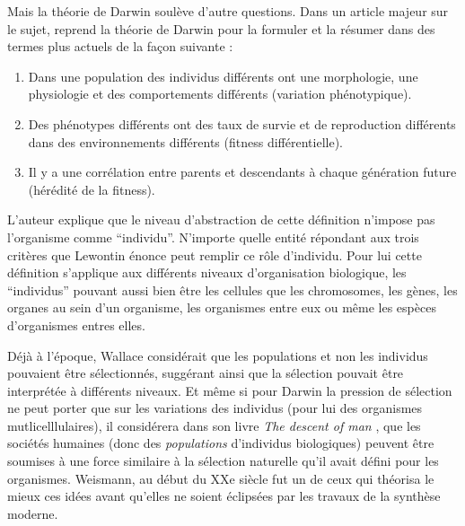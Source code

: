 Mais la théorie de Darwin soulève d'autre questions. Dans un article majeur sur le sujet, \cite{lewontin70unitsselection} reprend la théorie de Darwin pour la formuler et la résumer dans des termes plus actuels de la façon suivante :
\begin{enumerate}
	\item Dans une population des individus différents ont une morphologie, une physiologie et des comportements différents (variation phénotypique).
	\item Des phénotypes différents ont des taux de survie et de reproduction différents dans des environnements différents (fitness différentielle).
	\item Il y a une corrélation entre parents et descendants à chaque génération future (hérédité de la fitness).
\end{enumerate}

L'auteur explique que le niveau d'abstraction de cette définition n'impose pas l'organisme comme ``individu''. N'importe quelle entité répondant aux trois critères que Lewontin énonce peut remplir ce rôle d'individu. Pour lui cette définition s'applique aux différents niveaux d'organisation biologique, les ``individus'' pouvant aussi bien être les cellules que les chromosomes, les gènes, les organes au sein d'un organisme, les organismes entre eux ou même les espèces d'organismes entres elles. 

Déjà à l'époque, Wallace considérait que les populations et non les individus pouvaient être sélectionnés, suggérant ainsi que la sélection pouvait être interprétée à différents niveaux. Et même si pour Darwin la pression de sélection ne peut porter que sur les variations des individus (pour lui des organismes mutlicelllulaires), il considérera dans son livre \emph{The descent of man} \citep{darwin1871thedescentofman}, que les sociétés humaines (donc des \emph{populations} d'individus biologiques) peuvent être soumises à une force similaire à la sélection naturelle qu'il avait défini pour les organismes. Weismann, au début du XXe siècle fut un de ceux qui théorisa le mieux ces idées avant qu'elles ne soient éclipsées par les travaux de la synthèse moderne.


